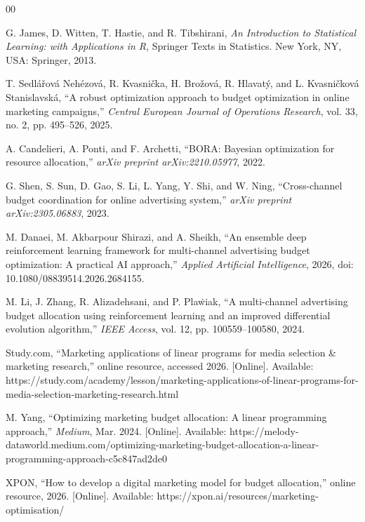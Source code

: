 \documentclass[conference]{IEEEtran}
\begin{document}
\begin{thebibliography}{00}

 G. James, D. Witten, T. Hastie, and R. Tibshirani, \emph{An Introduction to Statistical Learning: with Applications in R}, Springer Texts in Statistics. New York, NY, USA: Springer, 2013.

 T. Sedl\'a\v{r}ov\'a Neh\'ezov\'a, R. Kvasni\v{c}ka, H. Bro\v{z}ov\'a, R. Hlavat\'y, and L. Kvasni\v{c}kov\'a Stanislavsk\'a, ``A robust optimization approach to budget optimization in online marketing campaigns,'' \emph{Central European Journal of Operations Research}, vol. 33, no. 2, pp. 495--526, 2025.

 A. Candelieri, A. Ponti, and F. Archetti, ``BORA: Bayesian optimization for resource allocation,'' \emph{arXiv preprint arXiv:2210.05977}, 2022.

 G. Shen, S. Sun, D. Gao, S. Li, L. Yang, Y. Shi, and W. Ning, ``Cross-channel budget coordination for online advertising system,'' \emph{arXiv preprint arXiv:2305.06883}, 2023.

 M. Danaei, M. Akbarpour Shirazi, and A. Sheikh, ``An ensemble deep reinforcement learning framework for multi-channel advertising budget optimization: A practical AI approach,'' \emph{Applied Artificial Intelligence}, 2026, doi: 10.1080/08839514.2026.2684155.

 M. Li, J. Zhang, R. Alizadehsani, and P. Pla\.wiak, ``A multi-channel advertising budget allocation using reinforcement learning and an improved differential evolution algorithm,'' \emph{IEEE Access}, vol. 12, pp. 100559--100580, 2024.

 Study.com, ``Marketing applications of linear programs for media selection \& marketing research,'' online resource, accessed 2026. [Online]. Available: https://study.com/academy/lesson/marketing-applications-of-linear-programs-for-media-selection-marketing-research.html

 M. Yang, ``Optimizing marketing budget allocation: A linear programming approach,'' \emph{Medium}, Mar. 2024. [Online]. Available: https://melody-dataworld.medium.com/optimizing-marketing-budget-allocation-a-linear-programming-approach-c5c847ad2de0

 XPON, ``How to develop a digital marketing model for budget allocation,'' online resource, 2026. [Online]. Available: https://xpon.ai/resources/marketing-optimisation/


\end{thebibliography}
\end{document}
